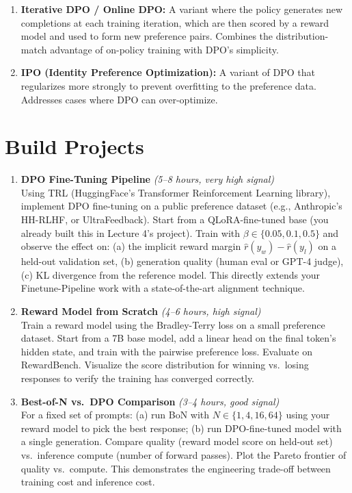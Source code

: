 \documentclass[11pt, a4paper]{article}
\begin{document}
\begin{enumerate}[leftmargin=2em]
  \item \textbf{Iterative DPO / Online DPO:} A variant where the policy generates new completions at each training iteration, which are then scored by a reward model and used to form new preference pairs. Combines the distribution-match advantage of on-policy training with DPO's simplicity.

  \item \textbf{IPO (Identity Preference Optimization):} A variant of DPO that regularizes more strongly to prevent overfitting to the preference data. Addresses cases where DPO can over-optimize.
\end{enumerate}

\newpage
\section{Build Projects}

\begin{enumerate}[leftmargin=2em]
  \item \textbf{DPO Fine-Tuning Pipeline} \textit{(5--8 hours, very high signal)}\\
  Using TRL (HuggingFace's Transformer Reinforcement Learning library), implement DPO fine-tuning on a public preference dataset (e.g., Anthropic's HH-RLHF, or UltraFeedback). Start from a QLoRA-fine-tuned base (you already built this in Lecture 4's project). Train with $\beta \in \{0.05, 0.1, 0.5\}$ and observe the effect on: (a) the implicit reward margin $\hat{r}(y_w) - \hat{r}(y_l)$ on a held-out validation set, (b) generation quality (human eval or GPT-4 judge), (c) KL divergence from the reference model. This directly extends your Finetune-Pipeline work with a state-of-the-art alignment technique.

  \item \textbf{Reward Model from Scratch} \textit{(4--6 hours, high signal)}\\
  Train a reward model using the Bradley-Terry loss on a small preference dataset. Start from a 7B base model, add a linear head on the final token's hidden state, and train with the pairwise preference loss. Evaluate on RewardBench. Visualize the score distribution for winning vs.\ losing responses to verify the training has converged correctly.

  \item \textbf{Best-of-N vs.\ DPO Comparison} \textit{(3--4 hours, good signal)}\\
  For a fixed set of prompts: (a) run BoN with $N \in \{1, 4, 16, 64\}$ using your reward model to pick the best response; (b) run DPO-fine-tuned model with a single generation. Compare quality (reward model score on held-out set) vs.\ inference compute (number of forward passes). Plot the Pareto frontier of quality vs.\ compute. This demonstrates the engineering trade-off between training cost and inference cost.
\end{enumerate}
\end{document}
